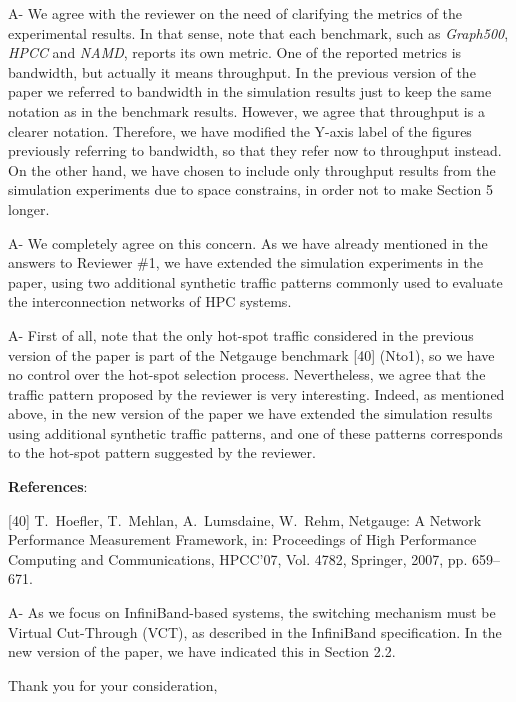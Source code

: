 \documentclass[a4paper,10pt]{letter}
\newcommand{\iba}{InfiniBand}
\begin{document}
\begin{letter}
A- We agree with the reviewer on the need of clarifying the metrics of the experimental results. In that sense, note that each benchmark, such as \textit{Graph500}, \textit{HPCC} and \textit{NAMD}, reports its  own  metric. One of the reported metrics is bandwidth, but actually it means throughput. In the previous version of the paper we referred to bandwidth in the simulation results just to keep the same notation as in the benchmark results. However, we agree that throughput is a clearer notation. Therefore, we have modified the Y-axis label of the figures previously referring to bandwidth, so that they refer now to throughput instead.
On the other hand, we have chosen to include only throughput results from the simulation experiments due to space constrains, in order not to make Section 5 longer. 


A- We completely agree on this concern. As we have already mentioned in the answers to Reviewer \#1, we have extended the simulation experiments in the paper, using two
additional synthetic traffic patterns commonly used to evaluate the interconnection networks of HPC systems.


A- First of all, note that the only hot-spot traffic considered in the previous version of the paper is part of the Netgauge benchmark [40] (Nto1), so
we have no control over the hot-spot selection process.
Nevertheless, we agree that the traffic pattern proposed by the reviewer is very interesting. Indeed, as mentioned above, in the new version of the paper we have extended the simulation results using additional synthetic traffic patterns, and one of these patterns corresponds to the hot-spot pattern suggested by the reviewer.


\textbf{References}:

[40]
T.~Hoefler, T.~Mehlan, A.~Lumsdaine, W.~Rehm, {Netgauge: A Network Performance
  Measurement Framework}, in: Proceedings of High Performance Computing and
  Communications, HPCC'07, Vol. 4782, Springer, 2007, pp. 659--671.



A- As we focus on \iba{}-based systems, the switching mechanism must be Virtual Cut-Through (VCT), as described in the \iba{} specification. In the new version of the paper, we have indicated this in Section 2.2. 

\closing{Thank you for your consideration,}


\end{letter}
\end{document}
